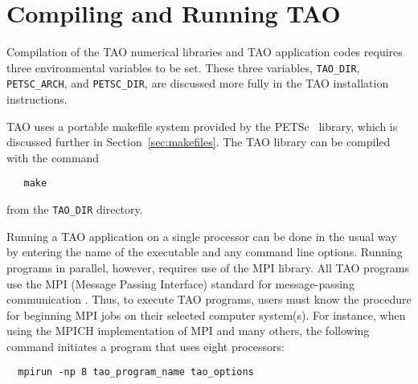 \section{Compiling and Running TAO}
\label{sec:running}

Compilation of the TAO numerical libraries and TAO application codes
requires three environmental variables to be set.  These three
variables, \texttt{TAO\_DIR}, \texttt{PETSC\_ARCH}, and \texttt{PETSC\_DIR},
are discussed more fully in the TAO installation instructions.

TAO uses a portable makefile system provided by the
PETSc~\cite{petsc-web-page,petsc-user-ref} library, which is discussed
further in Section~\ref{sec:makefiles}.  The TAO library can be
compiled with the command
\begin{verbatim}
   make
\end{verbatim}
\noindent
from the \texttt{TAO\_DIR} directory.  

Running a TAO application on a single processor can be done in the
usual way by entering the name of the executable and any command line
options.  Running programs in parallel, however, requires use of the
MPI library.  All TAO programs use the MPI (Message Passing Interface)
standard for message-passing communication \cite{MPI-final}.  Thus, to
execute TAO programs, users must know the procedure for beginning MPI
jobs on their selected computer system(s).  For instance, when using
the MPICH implementation of MPI \cite{mpich-web-page} and many others,
the following command initiates a program that uses eight processors:
\begin{verbatim}
  mpirun -np 8 tao_program_name tao_options
\end{verbatim}

\begin{comment}
  Figure~\ref{fig:exrun} illustrates compiling and running a TAO
  program using MPICH.  Note that different sites may have slightly
  different library and compiler names.
\end{comment}

\begin{comment}
  Users who are experiencing difficulties linking TAO programs should
  refer to the troubleshooting guide via the TAO home page {\tt
    http://www.mcs.anl.gov/tao} or the source code given by the file
  \texttt{{TAO\_DIR}/docs/troubleshooting.html}.
\end{comment}

